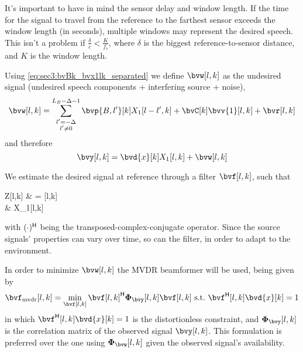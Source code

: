 It's important to have in mind the sensor delay and window length. If the time for the signal to travel from the reference to the farthest sensor exceeds the window length (in seconds), multiple windows may represent the desired speech. This isn't a problem if $\frac{\delta}{c} < \frac{K}{f_s}$, where $\delta$ is the biggest reference-to-sensor distance, and $K$ is the window length.

Using \cref{eq:sec3:bvBk_bvx1lk_separated} we define $\bvw[l,k]$ as the undesired signal (undesired speech components + interfering source + noise),
\begin{equation}
	\label{eq:sec3:def_undes_sig_bvwlk}
	\bvw[l,k] = \sum_{\substack{l'=-\Delta \\ l' \neq 0}}^{L_B-\Delta-1} \bvp{B,l'}[k] X_1[l-l',k] + \bvC[k] \bvv{1}[l,k] + \bvr[l,k]
\end{equation}
and therefore
\begin{equation}
    \label{eq:sec3:time-freq_model_final}
	\bvy[l,k] = \bvd{x}[k] X_1[l,k] + \bvw[l,k]
\end{equation}


We estimate the desired signal at reference through a filter $\bvf[l,k]$, such that
\begin{equations}
	Z[l,k]
	& = \he{\bvf}[l,k] \bvy[l,k] \\
	& \approx X_1[l,k]
\end{equations}
with $(\cdot)^{\mathsf{H}}$ being the transposed-complex-conjugate operator. Since the source signals' properties can vary over time, so can the filter, in order to adapt to the environment.

In order to minimize $\bvw[l,k]$ the MVDR beamformer \cite{erdogan_improved_2016} will be used, being given by
\begin{equation}
	\label{eq:sec3:minimization_problem_mvdr}
	\bvf_{\mvdr}[l,k] = \min_{\bvf[l,k]} \he{\bvf[l,k]} \Corr{\bvy}[l,k] \bvf[l,k]~\text{s.t.}~\he{\bvf}[l,k] \bvd{x}[k] = 1
\end{equation}
in which $\he{\bvf}[l,k] \bvd{x}[k] = 1$ is the distortionless constraint, and $\Corr{\bvy}[l,k]$ is the correlation matrix of the observed signal $\bvy[l,k]$. This formulation is preferred over the one using $\Corr{\bvw}[l,k]$ given the observed signal's availability.

